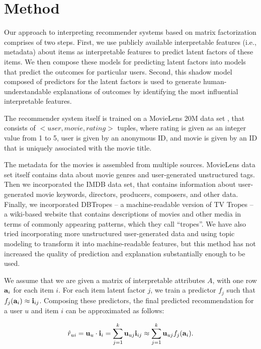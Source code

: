 \section{Method}

Our approach to interpreting recommender systems based on matrix factorization
comprises of two steps. First, we use publicly available interpretable features 
(i.e., metadata) about items as interpretable features
to predict latent factors of these items. We then compose these models
for predicting latent factors into models that predict the outcomes
for particular users. Second, this shadow model composed of predictors for the latent
factors is used to generate human-understandable explanations of outcomes
by identifying the most influential interpretable features.

The recommender system itself is trained on a MovieLens 20M data set
\cite{data-movielens}, that consists of $<user,movie,rating>$ tuples, where
rating is given as an integer value from 1 to 5, user is given by an anonymous
ID, and movie is given by an ID that is uniquely associated with the movie
title.

The metadata for the movies is assembled from multiple sources. MovieLens data
set itself contains data about movie genres and user-generated unstructured
tags. Then we incorporated the IMDB data set\cite{data-imdb}, that contains
information about user-generated movie keywords, directors, producers,
composers, and other data. Finally, we incorporated DBTropes\cite{data-dbtropes}
-- a machine-readable version of TV Tropes -- a wiki-based website that contains
descriptions of movies and other media in terms of commonly appearing patterns,
which they call ``tropes''. We have also tried incorporating more unstructured
user-generated data and using topic modeling to transform it into
machine-readable features, but this method has not increased the quality of
prediction and explanation substantially enough to be used.

We assume that we are given a matrix of interpretable attributes $A$, with
one row $\mathbf{a}_i$ for each item $i$. For each item latent factor $j$, we train
a predictor $f_j$  such that $f_j(\mathbf{a}_i) \approx \mathbf{i}_{ij}$.
Composing these predictors, the final predicted recommendation for a user $u$ and item $i$
can be approximated as follows:

\[\hat{r}_{ui} = \mathbf{u}_u\cdot\mathbf{i}_i = \sum_{j = 1}^k \mathbf{u}_{uj}\mathbf{i}_{ij} \approx
  \sum_{j = 1}^k \mathbf{u}_{uj}f_j(\mathbf{a}_i).
\]

